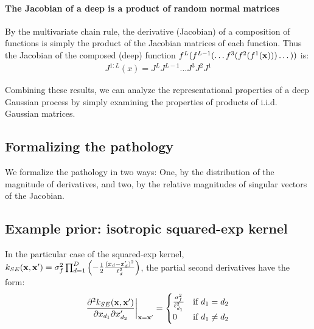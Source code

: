 \documentclass{article}
\newcommand{\fdeep}{f^{1:L}}
\newcommand{\Jxx}{J_{\vx \rightarrow \vy}(\vx)}
\newcommand{\Jy}{J_{\vy \rightarrow \vx}}
\begin{document}

\paragraph{The Jacobian of a deep \gp{} is a product of random normal matrices}
By the multivariate chain rule, the derivative (Jacobian) of a composition of functions is simply the product of the Jacobian matrices of each function.  
%
Thus the Jacobian of the composed (deep) function $f^L(f^{L-1}(\dots f^3(f^2(f^1({\bf{x}})))\dots))$ is:
%
\begin{align}
J^{1:L}(x) 
= J^L J^{L-1} \dots J^3 J^2 J^1
\end{align}

Combining these results, we can analyze the representational properties of a deep Gaussian process by simply examining the properties of products of i.i.d. Gaussian matrices.

\subsection{Formalizing the pathology}

We formalize the pathology in two ways:  One, by the distribution of the magnitude of derivatives, and two, by the relative magnitudes of singular vectors of the Jacobian.

\subsection{Example prior: isotropic squared-exp kernel}

In the particular case of the squared-exp kernel, $k_{SE}({\bf{x}}, {\bf{x}}') = \sigma^2_f \prod_{d=1}^D \left(-\frac{1}{2} \frac{(x_d - x_d')^2}{\ell_d^2} \right)$, the partial second derivatives have the form:
\begin{align}
\frac{\partial^2 k_{SE}({\bf{x}}, {\bf{x}}')}{\partial x_{d_1} \partial x_{d_2}'} \bigg|_{{\bf{x}}={\bf{x}}'}
= \begin{cases} 
\frac{\sigma^2_f}{\ell_{d_1}^2} & \mbox{if } d_1 = d_2 \\ 
0 & \mbox{if } d_1 \neq d_2 \end{cases}
\end{align}
\end{document}
